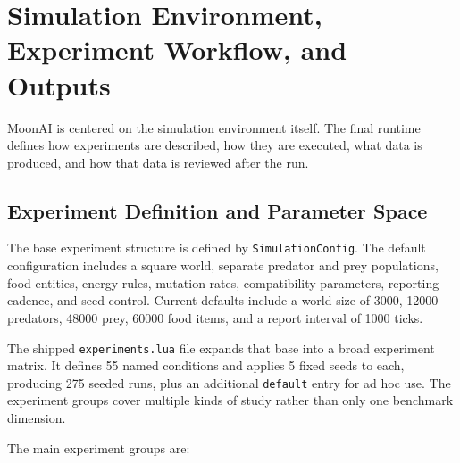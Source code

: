 \section{Simulation Environment, Experiment Workflow, and Outputs}
\label{sec:environment}

MoonAI is centered on the simulation environment itself. The final runtime defines how
experiments are described, how they are executed, what data is produced, and how that data is
reviewed after the run.

\subsection{Experiment Definition and Parameter Space}

The base experiment structure is defined by \texttt{SimulationConfig}. The default
configuration includes a square world, separate predator and prey populations, food entities,
energy rules, mutation rates, compatibility parameters, reporting cadence, and seed control.
Current defaults include a world size of 3000, 12000 predators, 48000 prey, 60000 food items,
and a report interval of 1000 ticks.

The shipped \texttt{experiments.lua} file expands that base into a broad experiment matrix. It
defines 55 named conditions and applies 5 fixed seeds to each, producing 275 seeded runs, plus
an additional \texttt{default} entry for ad hoc use. The experiment groups cover multiple kinds
of study rather than only one benchmark dimension.

The main experiment groups are:

